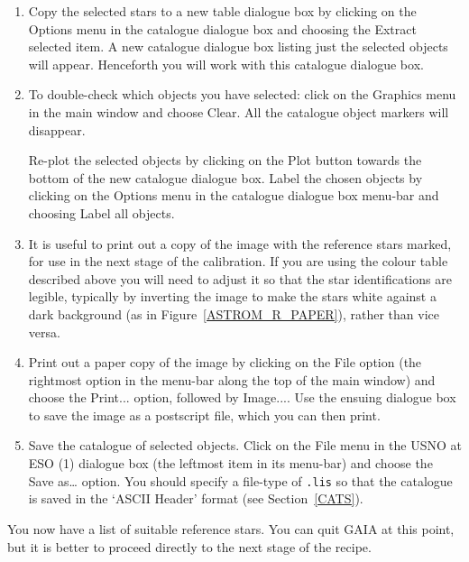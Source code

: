 \documentclass[twoside,11pt]{article}
\renewcommand{\_}{\texttt{\symbol{95}}}
\begin{document}
\begin{enumerate}
  \item Copy the selected stars to a new table dialogue box by clicking on
   the {\sf Options} menu in the catalogue dialogue box and choosing the
   {\sf Extract selected} item.  A new catalogue dialogue box listing just
   the selected objects will appear.  Henceforth you will work with this
   catalogue dialogue box.

  \item To double-check which objects you have selected: click on the {\sf
   Graphics} menu in the main window and choose {\sf Clear}.  All the
   catalogue object markers will disappear.

   Re-plot the selected objects by clicking on the {\sf Plot} button towards
   the bottom of the new catalogue dialogue box.  Label the chosen objects
   by clicking on the {\sf Options} menu in the catalogue dialogue box
   menu-bar and choosing {\sf Label all objects}.

  \item It is useful to print out a copy of the image with the reference
   stars marked, for use in the next stage of the calibration.  If you are
   using the colour table described above you will need to adjust it so
   that the star identifications are legible, typically by inverting the
   image to make the stars white against a dark background (as in
   Figure~\ref{ASTROM_R_PAPER}), rather than vice versa.

  \item Print out a paper copy of the image by clicking on the {\sf File}
   option (the rightmost option in the menu-bar along the top of the main
   window) and choose the {\sf Print...} option, followed by {\sf Image...}.
   Use the ensuing dialogue box to save the image as a postscript file,
   which you can then print.

  \item Save the catalogue of selected objects.  Click on the {\sf File}
   menu in the {\sf USNO at ESO (1)} dialogue box (the leftmost item in its
   menu-bar) and choose the {\sf Save as\ldots} option.  You should specify
   a file-type of {\tt .lis} so that the catalogue is saved in the `ASCII
   Header' format (see Section~\ref{CATS}).

\end{enumerate}

You now have a list of suitable reference stars. You can quit GAIA at this
point, but it is better to proceed directly to the next stage of the
recipe.
\end{document}
